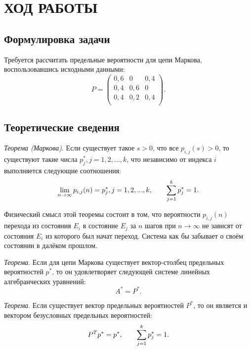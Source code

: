 \section{ХОД РАБОТЫ}

\subsection{Формулировка задачи}

Требуется рассчитать предельные вероятности для цепи Маркова, воспользовавшись
исходными данными:
\begin{equation*}
P = \begin{pmatrix}
      0{,}6 & 0 & 0{,}4 \\
      0{,}4 & 0{,}6 & 0 \\
      0{,}4 & 0{,}2 & 0{,}4 \\
    \end{pmatrix}.
\end{equation*}


\subsection{Теоретические сведения}
\label{subs:theory}

\textit{Теорема (Маркова)}. Если существует такое $s>0$, что все
$p_{i,j}(s)>0$, то существуют такие числа $p_j^*, j = 1,2,...,k$, что независимо
от индекса $i$ выполняется следующие соотношения:
\begin{equation*}
  \lim_{n\to\infty} p_{i,j}(n) = p_j^*, j=1,2, ...,k, \hspace{7mm}
  \sum\limits_{j=1}^{k}p_j^* = 1.
\end{equation*}

Физический смысл этой теоремы состоит в том, что вероятности $p_{i,j}(n)$
перехода из состояния $E_i$ в состояние $E_j$ за $n$ шагов при $n\to\infty$
не зависят от состояния $E_i$ из которого был начат переход. Система как бы
забывает о своём состоянии в далёком прошлом.

\textit{Теорема}. Если для цепи Маркова существует вектор-столбец предельных
вероятностей $p^*$, то он удовлетворяет следующей системе линейных алгебраических
уравнений:
\begin{equation*}
  A^* = P^*.
\end{equation*}

\textit{Теорема}. Если существует вектор предельных вероятностей $P^*$, то он
является и вектором безусловных предельных вероятностей:
\begin{equation*}
  P^T p^* = p^*, \hspace{7mm} \sum\limits_{j=1}^{k} p_j^* = 1.
\end{equation*}


